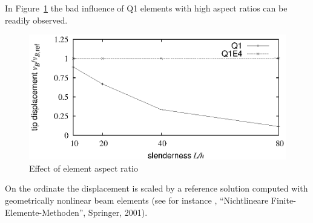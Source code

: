 In Figure~\ref{wall1:fig:eas-aspect-ratio-cantilever} the bad influence of
Q1 elements with high aspect ratios can be readily observed.
\begin{figure}[H]
  \begin{center}
    \includegraphics[width=0.8\linewidth]{eps/cantv-tipdispl}
  \end{center}
  \caption{Effect of element aspect ratio }
  \label{wall1:fig:eas-aspect-ratio-cantilever}
\end{figure}
On the ordinate the displacement is scaled by a reference solution computed
with geometrically nonlinear  beam elements (see for instance
, ``Nichtlineare Finite-Elemente-Methoden'', Springer, 2001). 


